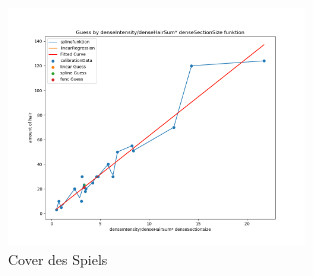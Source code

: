 \documentclass[german,a4paper,12pt,smallheadings,headsepline, titlepage, liststotoc, idextotoc,bibtoctoc,blibliography = totocnumbered]{scrartcl}
\begin{document}
\begin{figure}
	\centering
	\includegraphics[width=0.7\textwidth]{figBina/g12.png}
	\caption[]{Cover des Spiels}
	\label{img:Bina01}
\end{figure}\\



\printbibliography
\end{document}
